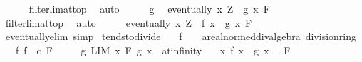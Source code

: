\begin{isabellebody}
\ \ \ \ \isamarkupfalse%
\ filterlim{\isacharunderscore}{\kern0pt}at{\isacharunderscore}{\kern0pt}top\ \isamarkupfalse%
\ auto\isanewline
\ \ \isamarkupfalse%
\ \isamarkupfalse%
\ g\ \isamarkupfalse%
\ {\isachardoublequoteopen}eventually\ {\isacharparenleft}{\kern0pt}{\isasymlambda}x{\isachardot}{\kern0pt}\ Z\ {\isasymle}\ g\ x{\isacharparenright}{\kern0pt}\ F{\isachardoublequoteclose}\isanewline
\ \ \ \ \isamarkupfalse%
\ filterlim{\isacharunderscore}{\kern0pt}at{\isacharunderscore}{\kern0pt}top\ \isamarkupfalse%
\ auto\isanewline
\ \ \isamarkupfalse%
\ \isamarkupfalse%
\ {\isachardoublequoteopen}eventually\ {\isacharparenleft}{\kern0pt}{\isasymlambda}x{\isachardot}{\kern0pt}\ Z\ {\isasymle}\ f\ x\ {\isacharplus}{\kern0pt}\ g\ x{\isacharparenright}{\kern0pt}\ F{\isachardoublequoteclose}\isanewline
\ \ \ \ \isamarkupfalse%
\ eventually{\isacharunderscore}{\kern0pt}elim\ simp\isanewline
{}\isamarkupfalse%
%
\endisatagproof
{\isafoldproof}%
%
\isadelimproof
\isanewline
%
\endisadelimproof
\isanewline
{}\isamarkupfalse%
\ tendsto{\isacharunderscore}{\kern0pt}divide{\isacharunderscore}{\kern0pt}{}{\isacharcolon}{\kern0pt}\isanewline
\ \ \ f\ {\isacharcolon}{\kern0pt}{\isacharcolon}{\kern0pt}\ {\isachardoublequoteopen}{\isacharunderscore}{\kern0pt}\ {\isasymRightarrow}\ {\isacharprime}{\kern0pt}a{\isacharcolon}{\kern0pt}{\isacharcolon}{\kern0pt}{\isacharbraceleft}{\kern0pt}real{\isacharunderscore}{\kern0pt}normed{\isacharunderscore}{\kern0pt}div{\isacharunderscore}{\kern0pt}algebra{\isacharcomma}{\kern0pt}\ division{\isacharunderscore}{\kern0pt}ring{\isacharbraceright}{\kern0pt}{\isachardoublequoteclose}\isanewline
\ \ \ f{\isacharcolon}{\kern0pt}\ {\isachardoublequoteopen}{\isacharparenleft}{\kern0pt}f\ {\isasymlonglongrightarrow}\ c{\isacharparenright}{\kern0pt}\ F{\isachardoublequoteclose}\isanewline
\ \ \ \ \ g{\isacharcolon}{\kern0pt}\ {\isachardoublequoteopen}LIM\ x\ F{\isachardot}{\kern0pt}\ g\ x\ {\isacharcolon}{\kern0pt}{\isachargreater}{\kern0pt}\ at{\isacharunderscore}{\kern0pt}infinity{\isachardoublequoteclose}\isanewline
\ \ \ {\isachardoublequoteopen}{\isacharparenleft}{\kern0pt}{\isacharparenleft}{\kern0pt}{\isasymlambda}x{\isachardot}{\kern0pt}\ f\ x\ {\isacharslash}{\kern0pt}\ g\ x{\isacharparenright}{\kern0pt}\ {\isasymlonglongrightarrow}\ {}{\isacharparenright}{\kern0pt}\ F{\isachardoublequoteclose}\isanewline

\end{isabellebody}

